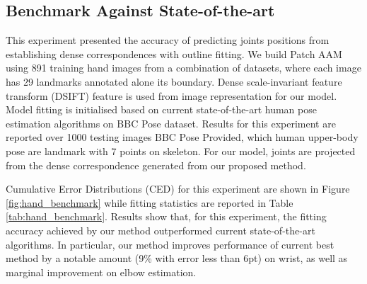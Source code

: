 \subsection{Benchmark Against State-of-the-art}
\label{exp:benchmark}
This experiment presented the accuracy of predicting joints positions from establishing dense correspondences with outline fitting. We build Patch AAM using 891 training hand images from a combination of datasets, where each image has 29 landmarks annotated alone its boundary. Dense scale-invariant feature transform (DSIFT)\cite{PoseletsICCV09} feature is used from image representation for our model. Model fitting is initialised based on current state-of-the-art human pose estimation algorithms on BBC Pose dataset. Results for this experiment are reported over 1000 testing images BBC Pose Provided, which human upper-body pose are landmark with 7 points on skeleton. For our model, joints are projected from the dense correspondence generated from our proposed method.

Cumulative Error Distributions (CED) for this experiment are shown in Figure \ref{fig:hand_benchmark} while fitting statistics are reported in Table \ref{tab:hand_benchmark}. Results show that, for this experiment, the fitting accuracy achieved by our method outperformed current state-of-the-art algorithms. In particular, our method improves performance of current best method \cite{pfister2015flowing} by a notable amount (9\% with error less than 6pt) on wrist, as well as marginal improvement on elbow estimation.


